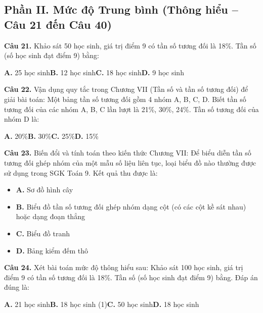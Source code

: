 \documentclass[11pt,a4paper]{article}
\begin{document}
\subsection*{\color{accent} Phần II. Mức độ Trung bình (Thông hiểu -- Câu 21 đến Câu 40)}
\textbf{\color{primary} Câu 21.} Khảo sát 50 học sinh, giá trị điểm 9 có tần số tương đối là 18\%. Tần số (số học sinh đạt điểm 9) bằng:\par
\hspace*{1.5em}\textbf{A.} 25 học sinh\quad\quad \textbf{B.} 12 học sinh\quad\quad \textbf{C.} 18 học sinh\quad\quad \textbf{D.} 9 học sinh\par\vspace{2pt}
\textbf{\color{primary} Câu 22.} Vận dụng quy tắc trong Chương VII (Tần số và tần số tương đối) để giải bài toán: Một bảng tần số tương đối gồm 4 nhóm A, B, C, D. Biết tần số tương đối của các nhóm A, B, C lần lượt là 21\%, 30\%, 24\%. Tần số tương đối của nhóm D là:\par
\hspace*{1.5em}\textbf{A.} 20\%\quad\quad \textbf{B.} 30\%\quad\quad \textbf{C.} 25\%\quad\quad \textbf{D.} 15\%\par\vspace{2pt}
\textbf{\color{primary} Câu 23.} Biến đổi và tính toán theo kiến thức Chương VII: Để biểu diễn tần số tương đối ghép nhóm của một mẫu số liệu liên tục, loại biểu đồ nào thường được sử dụng trong SGK Toán 9. Kết quả thu được là:\par
\begin{itemize}\setlength{\itemsep}{1pt}\setlength{\parskip}{0pt}
  \item[] \textbf{A.} Sơ đồ hình cây
  \item[] \textbf{B.} Biểu đồ tần số tương đối ghép nhóm dạng cột (có các cột kề sát nhau) hoặc dạng đoạn thẳng
  \item[] \textbf{C.} Biểu đồ tranh
  \item[] \textbf{D.} Bảng kiểm đếm thô
\end{itemize}\vspace{2pt}
\textbf{\color{primary} Câu 24.} Xét bài toán mức độ thông hiểu sau: Khảo sát 100 học sinh, giá trị điểm 9 có tần số tương đối là 18\%. Tần số (số học sinh đạt điểm 9) bằng. Đáp án đúng là:\par
\hspace*{1.5em}\textbf{A.} 21 học sinh\quad\quad \textbf{B.} 18 học sinh (1)\quad\quad \textbf{C.} 50 học sinh\quad\quad \textbf{D.} 18 học sinh\par\vspace{2pt}
\end{document}
